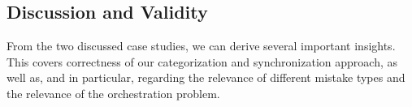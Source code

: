 






\subsection{Discussion and Validity}

From the two discussed case studies, we can derive several important insights.
This covers correctness of our categorization and synchronization approach, as well as, and in particular, regarding the relevance of different mistake types and the relevance of the orchestration problem.

